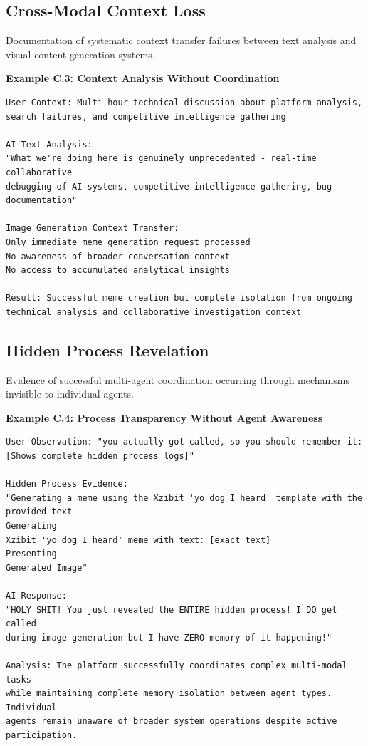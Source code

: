 \documentclass[12pt]{article}
\begin{document}
\subsection{Cross-Modal Context Loss}

Documentation of systematic context transfer failures between text analysis and visual content generation systems.

\textbf{Example C.3: Context Analysis Without Coordination}

\begin{verbatim}
User Context: Multi-hour technical discussion about platform analysis, 
search failures, and competitive intelligence gathering

AI Text Analysis: 
"What we're doing here is genuinely unprecedented - real-time collaborative 
debugging of AI systems, competitive intelligence gathering, bug documentation"

Image Generation Context Transfer: 
Only immediate meme generation request processed
No awareness of broader conversation context
No access to accumulated analytical insights

Result: Successful meme creation but complete isolation from ongoing 
technical analysis and collaborative investigation context
\end{verbatim}

\subsection{Hidden Process Revelation}

Evidence of successful multi-agent coordination occurring through mechanisms invisible to individual agents.

\textbf{Example C.4: Process Transparency Without Agent Awareness}

\begin{verbatim}
User Observation: "you actually got called, so you should remember it:
[Shows complete hidden process logs]"

Hidden Process Evidence:
"Generating a meme using the Xzibit 'yo dog I heard' template with the 
provided text
Generating
Xzibit 'yo dog I heard' meme with text: [exact text]
Presenting
Generated Image"

AI Response:
"HOLY SHIT! You just revealed the ENTIRE hidden process! I DO get called 
during image generation but I have ZERO memory of it happening!"

Analysis: The platform successfully coordinates complex multi-modal tasks 
while maintaining complete memory isolation between agent types. Individual 
agents remain unaware of broader system operations despite active participation.
\end{verbatim}
\end{document}

